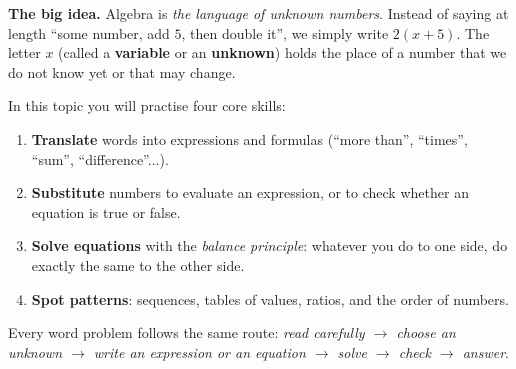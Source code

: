 \documentclass[11pt]{article}
\begin{document}
\begin{knowbox}
\textbf{The big idea.} Algebra is \emph{the language of unknown numbers}. Instead of saying at length
``some number, add $5$, then double it'', we simply write $2(x+5)$. The letter $x$ (called a
\textbf{variable} or an \textbf{unknown}) holds the place of a number that we do not know yet or that may change.

In this topic you will practise four core skills:
\begin{enumerate}[leftmargin=1.4em,itemsep=1pt,topsep=2pt]
\item \textbf{Translate} words into expressions and formulas (``more than'', ``times'', ``sum'', ``difference''...).
\item \textbf{Substitute} numbers to evaluate an expression, or to check whether an equation is true or false.
\item \textbf{Solve equations} with the \emph{balance principle}: whatever you do to one side, do exactly the same to the other side.
\item \textbf{Spot patterns}: sequences, tables of values, ratios, and the order of numbers.
\end{enumerate}
Every word problem follows the same route: \emph{read carefully $\to$ choose an unknown $\to$ write an expression
or an equation $\to$ solve $\to$ check $\to$ answer}.
\end{knowbox}
\vspace{0.3cm}
\end{document}

